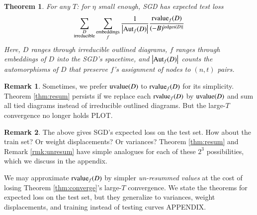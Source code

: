 \documentclass{article}
\theoremstyle{plain}
\newtheorem{thm}{Theorem}
\theoremstyle{definition}
\newtheorem{rmk}{Remark}
\newcommand{\wabs}[1]{\left|#1\right|}
\newcommand{\Aut}{\text{\textnormal{Aut}}}
\newcommand{\uvalue}{\text{\textnormal{uvalue}}}
\newcommand{\rvalue}{\text{\textnormal{rvalue}}}
\newcommand{\edges}{\text{\textnormal{edges}}}
\begin{document}
        \begin{thm}
            For any $T$: for $\eta$ small enough, SGD has expected test loss
            \begin{equation*} \label{eq:resum}
                \sum_{\substack{D \\ \text{irreducible}}}
                \sum_{\substack{\text{embeddings} \\ f}}
                \frac{1}{\wabs{\Aut_f(D)}}
                \frac{{\rvalue_f}(D)}{(-B)^{|\edges(D)|}}
            \end{equation*}
            Here, $D$ ranges through irreducible outlined diagrams, $f$ ranges
            through embeddings of $D$ into the SGD's spacetime, and
            $\wabs{\Aut_f(D)}$ counts the automorphisms of $D$ that
            preserve $f$'s assignment of nodes to $(n,t)$ pairs.
        \end{thm}

        \begin{rmk}
            Sometimes, we prefer $\uvalue(D)$ to $\rvalue_f(D)$ for its
            simplicity.  Theorem \ref{thm:resum} persists if we replace each
            $\rvalue_f(D)$ by $\uvalue(D)$ and sum all tied diagrams instead
            of irreducible outlined diagrams.  But the large-$T$ convergence
            no longer holds {\color{red} PLOT}.
        \end{rmk}


        \begin{rmk}
            The above gives SGD's expected loss on the test set.  How about
            the train set?  Or weight displacements?  Or variances?
            Theorem \ref{thm:resum} and Remark \ref{rmk:unresum} have simple
            analogues for each of these $2^3$ possibilities, which we discuss
            in the appendix. 
        \end{rmk}

        We may approximate $\rvalue_f(D)$ by simpler \emph{un-resummed values}
        at the cost of losing Theorem \ref{thm:converge}'s large-$T$ convergence.
        We state the theorems for expected loss on the test set, but they
        generalize to variances, weight displacements, and training instead of
        testing curves {\color{red} APPENDIX}.
 
\end{document}
